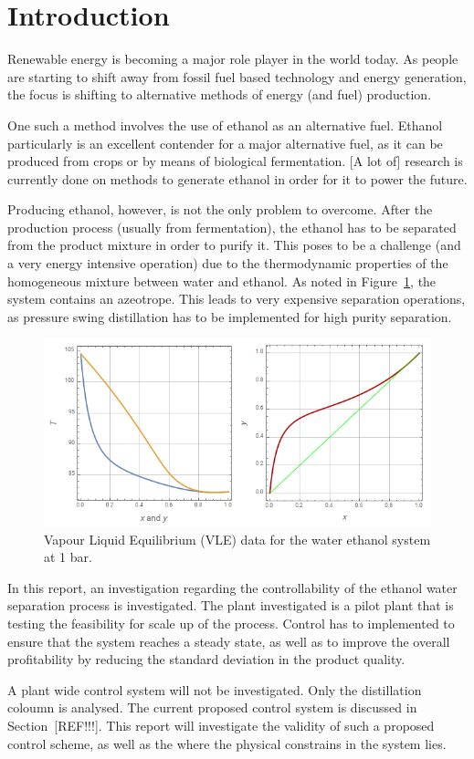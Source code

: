 \section{Introduction}

Renewable energy is becoming a major role player in the world today. As people are starting to shift away from fossil fuel based technology and energy generation, the focus is shifting to alternative methods of energy (and fuel) production.

One such a method involves the use of ethanol as an alternative fuel. Ethanol particularly is an excellent contender for a major alternative fuel, as it can be produced from crops or by means of biological fermentation. [A lot of] research is currently done on methods to generate ethanol in order for it to power the future. 

Producing ethanol, however, is not the only problem to overcome. After the production process (usually from fermentation), the ethanol has to be separated from the product mixture in order to purify it. This poses to be a challenge (and a very energy intensive operation) due to the thermodynamic properties of the homogeneous mixture between water and ethanol. As noted in Figure~\ref{fig:vle-ethanol}, the system contains an azeotrope. This leads to very expensive separation operations, as pressure swing distillation has to be implemented for high purity separation.

\begin{figure}[tbph!]
	\centering
	\includegraphics[width=0.7\linewidth]{"Figures/VLE Ethanol 2"}
	\caption{Vapour Liquid Equilibrium (VLE) data for the water ethanol system at 1 bar.}
	\label{fig:vle-ethanol}
\end{figure}

In this report, an investigation regarding the controllability of the ethanol water separation process is investigated. The plant investigated is a pilot plant that is testing the feasibility for scale up of the process. Control has to implemented to ensure that the system reaches a steady state, as well as to improve the overall profitability by reducing the standard deviation in the product quality.

A plant wide control system will not be investigated. Only the distillation coloumn is analysed. The current proposed control system is discussed in Section~[REF!!!]. This report will investigate the validity of such a proposed control scheme, as well as the where the physical constrains in the system lies.